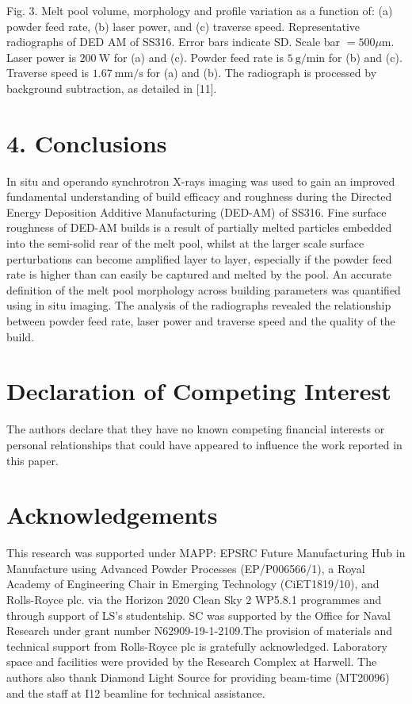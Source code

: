 \documentclass[10pt]{article}
\begin{document}
Fig. 3. Melt pool volume, morphology and profile variation as a function of: (a) powder feed rate, (b) laser power, and (c) traverse speed. Representative radiographs of DED AM of SS316. Error bars indicate SD. Scale bar $=500 \mu \mathrm{m}$. Laser power is $200 \mathrm{~W}$ for (a) and (c). Powder feed rate is $5 \mathrm{~g} / \mathrm{min}$ for (b) and (c). Traverse speed is $1.67 \mathrm{~mm} / \mathrm{s}$ for (a) and (b). The radiograph is processed by background subtraction, as detailed in [11].

\section*{4. Conclusions}
In situ and operando synchrotron X-rays imaging was used to gain an improved fundamental understanding of build efficacy and roughness during the Directed Energy Deposition Additive Manufacturing (DED-AM) of SS316. Fine surface roughness of DED-AM builds is a result of partially melted particles embedded into the semi-solid rear of the melt pool, whilst at the larger scale surface perturbations can become amplified layer to layer, especially if the powder feed rate is higher than can easily be captured and melted by the pool. An accurate definition of the melt pool morphology across building parameters was quantified using in situ imaging. The analysis of the radiographs revealed the relationship between powder feed rate, laser power and traverse speed and the quality of the build.

\section*{Declaration of Competing Interest}
The authors declare that they have no known competing financial interests or personal relationships that could have appeared to influence the work reported in this paper.

\section*{Acknowledgements}
This research was supported under MAPP: EPSRC Future Manufacturing Hub in Manufacture using Advanced Powder Processes (EP/P006566/1), a Royal Academy of Engineering Chair in Emerging Technology (CiET1819/10), and Rolls-Royce plc. via the Horizon 2020 Clean Sky 2 WP5.8.1 programmes and through support of LS's studentship. SC was supported by the Office for Naval Research under grant number N62909-19-1-2109.The provision of materials and technical support from Rolls-Royce plc is gratefully acknowledged. Laboratory space and facilities were provided by the Research Complex at Harwell. The authors also thank Diamond Light Source for providing beam-time (MT20096) and the staff at I12 beamline for technical assistance.
\end{document}
